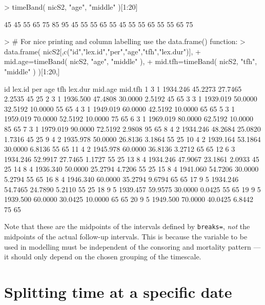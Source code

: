 \documentclass[a4paper,twoside,12pt]{article}
\begin{document}
\begin{Schunk}
\begin{Sinput}
> timeBand( nicS2, "age", "middle" )[1:20]
\end{Sinput}
\begin{Soutput}
 [1] 45 45 55 65 75 85 95 45 55 55 65 55 45 55 55 65 55 55 65 75
\end{Soutput}
\begin{Sinput}
> # For nice printing and column labelling use the data.frame() function:
> data.frame( nicS2[,c("id","lex.id","per","age","tfh","lex.dur")],
+             mid.age=timeBand( nicS2, "age", "middle" ),
+             mid.tfh=timeBand( nicS2, "tfh", "middle" ) )[1:20,]
\end{Sinput}
\begin{Soutput}
   id lex.id      per     age     tfh lex.dur mid.age mid.tfh
1   3      1 1934.246 45.2273 27.7465  2.2535      45      25
2   3      1 1936.500 47.4808 30.0000  2.5192      45      65
3   3      1 1939.019 50.0000 32.5192 10.0000      55      65
4   3      1 1949.019 60.0000 42.5192 10.0000      65      65
5   3      1 1959.019 70.0000 52.5192 10.0000      75      65
6   3      1 1969.019 80.0000 62.5192 10.0000      85      65
7   3      1 1979.019 90.0000 72.5192  2.9808      95      65
8   4      2 1934.246 48.2684 25.0820  1.7316      45      25
9   4      2 1935.978 50.0000 26.8136  3.1864      55      25
10  4      2 1939.164 53.1864 30.0000  6.8136      55      65
11  4      2 1945.978 60.0000 36.8136  3.2712      65      65
12  6      3 1934.246 52.9917 27.7465  1.1727      55      25
13  8      4 1934.246 47.9067 23.1861  2.0933      45      25
14  8      4 1936.340 50.0000 25.2794  4.7206      55      25
15  8      4 1941.060 54.7206 30.0000  5.2794      55      65
16  8      4 1946.340 60.0000 35.2794  9.6794      65      65
17  9      5 1934.246 54.7465 24.7890  5.2110      55      25
18  9      5 1939.457 59.9575 30.0000  0.0425      55      65
19  9      5 1939.500 60.0000 30.0425 10.0000      65      65
20  9      5 1949.500 70.0000 40.0425  6.8442      75      65
\end{Soutput}
\end{Schunk}
Note that these are the midpoints of the intervals defined by
\texttt{breaks=}, \emph{not} the midpoints of the actual follow-up
intervals. This is because the variable to be used in modelling must
be independent of the consoring and mortality pattern --- it should
only depend on the chosen grouping of the timescale.

\section{Splitting time at a specific date}
\end{document}
